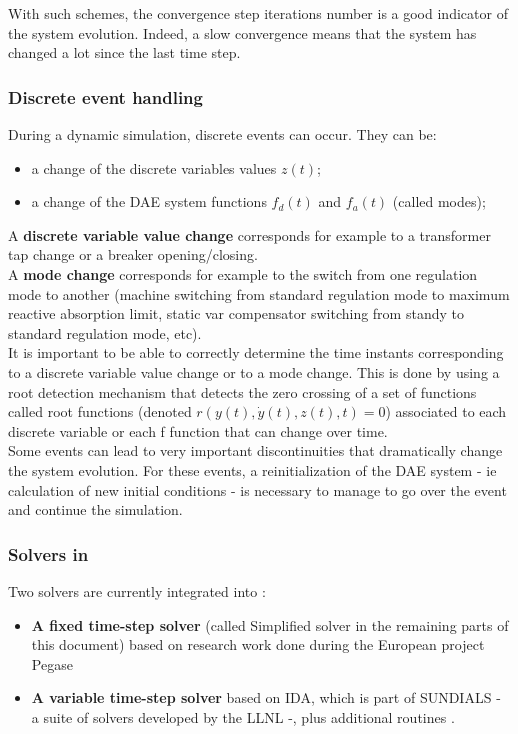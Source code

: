 \documentclass[a4paper, 12pt]{report}
\begin{document}
With such schemes, the convergence step iterations number is a good indicator of the system evolution. Indeed, a slow convergence means that the system has changed a lot since the last time step.

\subsubsection{Discrete event handling}

During a dynamic simulation, discrete events can occur. They can be:
\begin{itemize}
\item a change of the discrete variables values $z(t)$;
\item a change of the \ac{DAE} system functions $f_d(t)$ and $f_a(t)$ (called modes);
\end{itemize}

A \textbf{discrete variable value change} corresponds for example to a transformer tap change or a breaker opening/closing. \\

A \textbf{mode change} corresponds for example to the switch from one regulation mode to another (machine switching from standard regulation mode to maximum reactive absorption limit, static var compensator switching from standy to standard regulation mode, etc). \\

It is important to be able to correctly determine the time instants corresponding to a discrete variable value change or to a mode change. This is done by using a root detection mechanism that detects the zero crossing of a set of functions called root functions (denoted $r(y(t), \dot{y}(t), z(t), t) = 0$) associated to each discrete variable or each f function that can change over time. \\

Some events can lead to very important discontinuities that dramatically change the system evolution. For these events, a reinitialization of the \ac{DAE} system - ie calculation of new initial conditions - is necessary to manage to go over the event and continue the simulation. \\

\subsubsection{Solvers in \Dynawo}

Two solvers are currently integrated into \Dynawo:
\begin{itemize}
\item \textbf{A fixed time-step solver} (called Simplified solver in the remaining parts of this document) based on research work done during the European project Pegase \cite{Pegase_Report, Pegase_Events, Pegase_IEEE_GM}
\item \textbf{A variable time-step solver} based on IDA, which is part of \ac{SUNDIALS} - a suite of solvers developed by the \ac{LLNL} -, plus additional routines \cite{hindmarsh2005sundials}.
\end{itemize}
\end{document}
